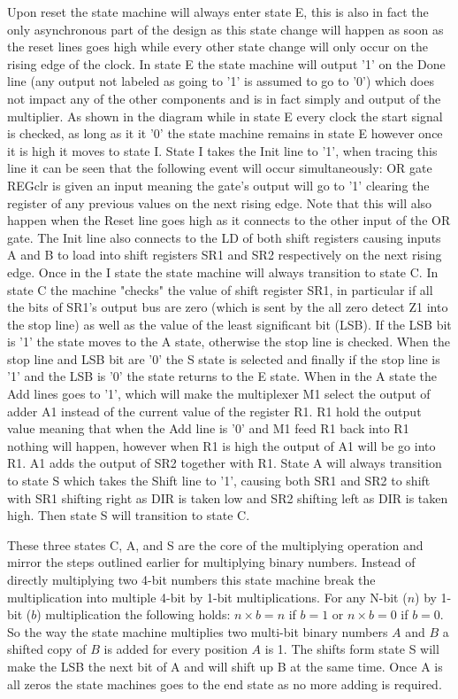 \documentclass[11pt]{article}
\begin{document}
Upon reset the state machine will always enter state E,
this is also in fact the only asynchronous part of the design as this state change will happen as soon as the reset lines goes high while every other state change will only occur on the rising edge of the clock.
In state E the state machine will output '1' on the Done line (any output not labeled as going to '1' is assumed to go to '0') which does not impact any of the other components and is in fact simply and output of the multiplier.
As shown in the diagram while in state E every clock the start signal is checked, as long as it it '0' the state machine remains in state E however once it is high it moves to state I.
State I takes the Init line to '1', when tracing this line it can be seen that the following event will occur simultaneously: OR gate REGclr is given an input meaning the gate's output will go to '1' clearing the register of any previous values on the next rising edge.
Note that this will also happen when the Reset line goes high as it connects to the other input of the OR gate. 
The Init line also connects to the LD of both shift registers causing inputs A and B to load into shift registers SR1 and SR2 respectively on the next rising edge.
Once in the I state the state machine will always transition to state C. 
In state C the machine "checks" the value of shift register SR1,
in particular if all the bits of SR1's output bus are zero (which is sent by the all zero detect Z1 into the stop line) as well as the value of the least significant bit (LSB).
If the LSB bit is '1' the state moves to the A state, otherwise the stop line is checked.
When the stop line and LSB bit are '0' the S state is selected and finally if the stop line is '1' and the LSB is '0' the state returns to the E state.
When in the A state the Add lines goes to '1', which will make the multiplexer M1 select the output of adder A1 instead of the current value of the register R1.
R1 hold the output value meaning that when the Add line is '0' and M1 feed R1 back into R1 nothing will happen, however when R1 is high the output of A1 will be go into R1.
A1 adds the output of SR2 together with R1.
State A will always transition to state S which takes the Shift line to '1', causing both SR1 and SR2 to shift with SR1 shifting right as DIR is taken low and SR2 shifting left as DIR is taken high.
Then state S will transition to state C.

These three states C, A, and S are the core of the multiplying operation and mirror the steps outlined earlier for multiplying binary numbers.
Instead of directly multiplying two 4-bit numbers this state machine break the multiplication into multiple 4-bit by 1-bit multiplications.
For any N-bit ($n$) by 1-bit ($b$) multiplication the following holds: $n \times b = n$ if $b = 1$ or $n \times b = 0$ if $b = 0$.
So the way the state machine multiplies two multi-bit binary numbers $A$ and $B$ a shifted copy of $B$ is added for every position $A$ is 1\cite{dally}. 
The shifts form state S will make the LSB the next bit of A and will shift up B at the same time.
Once A is all zeros the state machines goes to the end state as no more adding is required. 
\end{document}
